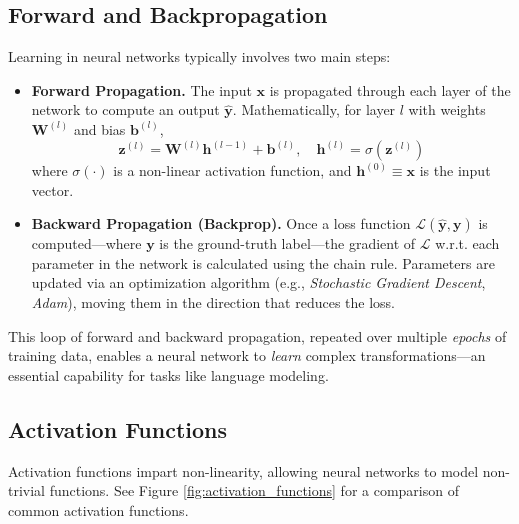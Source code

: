\subsection{Forward and Backpropagation}
\noindent
Learning in neural networks typically involves two main steps:
\begin{itemize}
    \item \textbf{Forward Propagation.} The input $\mathbf{x}$ is propagated through each layer of the network to compute an output $\hat{\mathbf{y}}$. Mathematically, for layer $l$ with weights $\mathbf{W}^{(l)}$ and bias $\mathbf{b}^{(l)}$,
    \begin{equation}\label{eq:forward_prop}
        \mathbf{z}^{(l)} = \mathbf{W}^{(l)} \mathbf{h}^{(l-1)} + \mathbf{b}^{(l)}, \quad \mathbf{h}^{(l)} = \sigma(\mathbf{z}^{(l)})
    \end{equation}
    where $\sigma(\cdot)$ is a non-linear activation function, and $\mathbf{h}^{(0)} \equiv \mathbf{x}$ is the input vector.

    \item \textbf{Backward Propagation (Backprop).} Once a loss function $\mathcal{L}(\hat{\mathbf{y}}, \mathbf{y})$ is computed—where $\mathbf{y}$ is the ground-truth label—the gradient of $\mathcal{L}$ w.r.t. each parameter in the network is calculated using the chain rule. Parameters are updated via an optimization algorithm (e.g., \textit{Stochastic Gradient Descent}, \textit{Adam}), moving them in the direction that reduces the loss.
\end{itemize}

\noindent
This loop of forward and backward propagation, repeated over multiple \emph{epochs} of training data, enables a neural network to \emph{learn} complex transformations—an essential capability for tasks like language modeling.

\subsection{Activation Functions}
\noindent
Activation functions impart non-linearity, allowing neural networks to model non-trivial functions.  See Figure \ref{fig:activation_functions} for a comparison of common activation functions.

